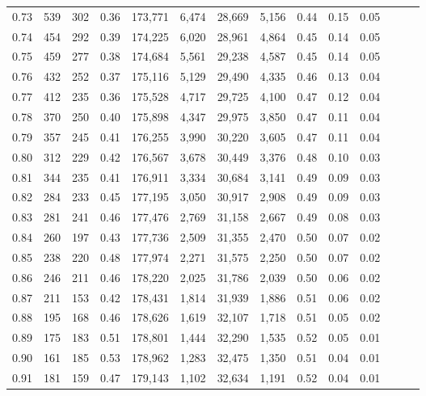 \begin{tabular}{rrrrrrrrrrrrrr}
0.73 &    539 &  302 &  0.36 &  173,771 &    6,474 &  28,669 &   5,156 &  0.44 &  0.15 &      0.05 \\
0.74 &    454 &  292 &  0.39 &  174,225 &    6,020 &  28,961 &   4,864 &  0.45 &  0.14 &      0.05 \\
0.75 &    459 &  277 &  0.38 &  174,684 &    5,561 &  29,238 &   4,587 &  0.45 &  0.14 &      0.05 \\
0.76 &    432 &  252 &  0.37 &  175,116 &    5,129 &  29,490 &   4,335 &  0.46 &  0.13 &      0.04 \\
0.77 &    412 &  235 &  0.36 &  175,528 &    4,717 &  29,725 &   4,100 &  0.47 &  0.12 &      0.04 \\
0.78 &    370 &  250 &  0.40 &  175,898 &    4,347 &  29,975 &   3,850 &  0.47 &  0.11 &      0.04 \\
0.79 &    357 &  245 &  0.41 &  176,255 &    3,990 &  30,220 &   3,605 &  0.47 &  0.11 &      0.04 \\
0.80 &    312 &  229 &  0.42 &  176,567 &    3,678 &  30,449 &   3,376 &  0.48 &  0.10 &      0.03 \\
0.81 &    344 &  235 &  0.41 &  176,911 &    3,334 &  30,684 &   3,141 &  0.49 &  0.09 &      0.03 \\
0.82 &    284 &  233 &  0.45 &  177,195 &    3,050 &  30,917 &   2,908 &  0.49 &  0.09 &      0.03 \\
0.83 &    281 &  241 &  0.46 &  177,476 &    2,769 &  31,158 &   2,667 &  0.49 &  0.08 &      0.03 \\
0.84 &    260 &  197 &  0.43 &  177,736 &    2,509 &  31,355 &   2,470 &  0.50 &  0.07 &      0.02 \\
0.85 &    238 &  220 &  0.48 &  177,974 &    2,271 &  31,575 &   2,250 &  0.50 &  0.07 &      0.02 \\
0.86 &    246 &  211 &  0.46 &  178,220 &    2,025 &  31,786 &   2,039 &  0.50 &  0.06 &      0.02 \\
0.87 &    211 &  153 &  0.42 &  178,431 &    1,814 &  31,939 &   1,886 &  0.51 &  0.06 &      0.02 \\
0.88 &    195 &  168 &  0.46 &  178,626 &    1,619 &  32,107 &   1,718 &  0.51 &  0.05 &      0.02 \\
0.89 &    175 &  183 &  0.51 &  178,801 &    1,444 &  32,290 &   1,535 &  0.52 &  0.05 &      0.01 \\
0.90 &    161 &  185 &  0.53 &  178,962 &    1,283 &  32,475 &   1,350 &  0.51 &  0.04 &      0.01 \\
0.91 &    181 &  159 &  0.47 &  179,143 &    1,102 &  32,634 &   1,191 &  0.52 &  0.04 &      0.01 \\

\end{tabular}
